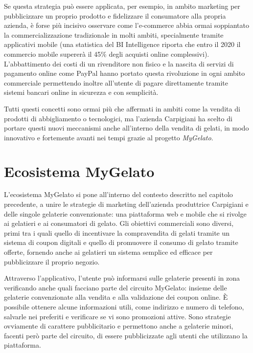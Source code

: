 Se questa strategia può essere applicata, per esempio, in ambito marketing
per pubblicizzare un proprio prodotto e fidelizzare il consumatore
alla propria azienda, è forse più incisivo osservare come l'e-commerce
abbia ormai soppiantato la commercializzazione tradizionale in molti
ambiti, specialmente tramite applicativi mobile (una statistica del
BI Intelligence riporta che entro il 2020 il commercio mobile supererà
il 45\% degli acquisti online complessivi). L'abbattimento dei costi
di un rivenditore non fisico e la nascita di servizi di pagamento
online come PayPal hanno portato questa rivoluzione in ogni ambito
commerciale permettendo inoltre all'utente di pagare direttamente
tramite sistemi bancari online in sicurezza e con semplicità.\bigskip{}

Tutti questi concetti sono ormai più che affermati in ambiti come
la vendita di prodotti di abbigliamento o tecnologici, ma l'azienda
Carpigiani ha scelto di portare questi nuovi meccanismi anche all'interno
della vendita di gelati, in modo innovativo e fortemente avanti nei
tempi grazie al progetto \emph{MyGelato}.\bigskip{}


\section{Ecosistema MyGelato}

L'ecosistema MyGelato si pone all'interno del contesto descritto nel
capitolo precedente, a unire le strategie di marketing dell'azienda
produttrice Carpigiani e delle singole gelaterie convenzionate: una
piattaforma web e mobile che si rivolge ai gelatieri e ai consumatori
di gelato. Gli obiettivi commerciali sono diversi, primi tra i quali
quello di incentivare la compravendita di gelati tramite un sistema
di coupon digitali e quello di promuovere il consumo di gelato tramite
offerte, fornendo anche ai gelatieri un sistema semplice ed efficace
per pubblicizzare il proprio negozio.\bigskip{}

Attraverso l'applicativo, l'utente può informarsi sulle gelaterie
presenti in zona verificando anche quali facciano parte del circuito
MyGelato: insieme delle gelaterie convenzionate alla vendita e alla
validazione dei coupon online. È possibile ottenere alcune informazioni
utili, come indirizzo e numero di telefono, salvarle nei preferiti
e verificare se vi sono promozioni attive. Sono strategie ovviamente
di carattere pubblicitario e permettono anche a gelaterie minori,
facenti però parte del circuito, di essere pubblicizzate agli utenti
che utilizzano la piattaforma.


